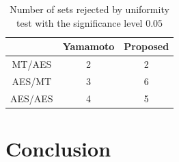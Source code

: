 \documentclass[dvipdfmx,english]{ampmt} %
\begin{document}
\begin{table}[t]
  \centering
  \caption{Number of sets rejected by uniformity test with the significance level $0.05$}
  \begin{tabular}{ccc} \hline
              & Yamamoto \cite{yamamoto2016highly} & Proposed \\ \hline 
    MT/AES    & 2         & 2        \\
    AES/MT    & 3         & 6        \\
    AES/AES   & 4         & 5        \\ \hline 
  \end{tabular}
  \label{tab:uniformity_3}
\end{table}
\clearpage
\section{Conclusion}\label{sec:conclusion}

\clearpage
\acknowledgment

\clearpage
{} %


\clearpage
\appendix

\clearpage
% 
\newpage
\end{document}

